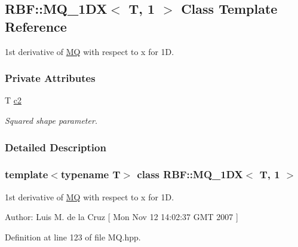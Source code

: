 \hypertarget{classRBF_1_1MQ__1DX_3_01T_00_011_01_4}{
\subsection{RBF::MQ\_\-1DX$<$ T, 1 $>$ Class Template Reference}
\label{classRBF_1_1MQ__1DX_3_01T_00_011_01_4}
}
1st derivative of \hyperlink{classRBF_1_1MQ}{MQ} with respect to x for 1D.  


\subsubsection*{Private Attributes}
\begin{CompactItemize}
\item 
\hypertarget{classRBF_1_1MQ__1DX_3_01T_00_011_01_4_7d42e9072bdf757bac4c3b1d444984e5}{
T \hyperlink{classRBF_1_1MQ__1DX_3_01T_00_011_01_4_7d42e9072bdf757bac4c3b1d444984e5}{c2}}
\label{classRBF_1_1MQ__1DX_3_01T_00_011_01_4_7d42e9072bdf757bac4c3b1d444984e5}

\begin{CompactList}\small\item\em Squared shape parameter. \item\end{CompactList}\end{CompactItemize}


\subsubsection{Detailed Description}
\subsubsection*{template$<$typename T$>$ class RBF::MQ\_\-1DX$<$ T, 1 $>$}

1st derivative of \hyperlink{classRBF_1_1MQ}{MQ} with respect to x for 1D. 

\begin{Desc}
\item[Author:]Luis M. de la Cruz \mbox{[} Mon Nov 12 14:02:37 GMT 2007 \mbox{]} \end{Desc}


Definition at line 123 of file MQ.hpp.